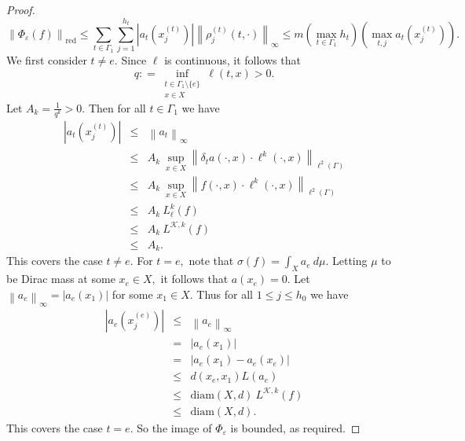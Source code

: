 \documentclass[a4paper,11pt,reqno]{amsart}
\theoremstyle{plain}
\theoremstyle{mainthmstyle}
\theoremstyle{named}
\numberwithin{equation}{section}
\newcommand{\Bea}{\begin{eqnarray*}}
\newcommand{\Eea}{\end{eqnarray*}}
\begin{document}
\begin{proof}
$$\left \|\Phi_{\varepsilon} (f) \right \|_{\mathrm {red}} \leq \sum\limits_{t \in \Gamma_1} \sum\limits_{j = 1}^{h_t} \left \lvert a_t \left (x_j^{(t)} \right ) \right \rvert \left \|\rho_j^{(t)} (t, \cdot) \right \|_{\infty} \leq m \left (\max\limits_{t \in \Gamma_1} h_t \right ) \left (\max\limits_{t, j} a_t \left (x_{j}^{(t)} \right ) \right ).$$
We first consider $t \neq e.$ Since $\ell$ is continuous, it follows that $$q : = \inf\limits_{\substack {t \in \Gamma_1 \setminus \{e\} \\ x \in X}} \ell (t, x) > 0.$$ Let $A_k = \frac {1} {q^k} > 0.$ Then for all $t \in \Gamma_1$ we have
\Bea
\left \lvert a_t \left (x_j^{(t)} \right ) \right \rvert &  \leq & \left \|a_t \right \|_{\infty} \\ & \leq & A_k\ \sup_{x \in X} \left \|\delta_t a (\cdot, x) \cdot \ell^{k} (\cdot, x) \right \|_{\ell^{2} (\Gamma)} \\ & \leq & A_k\ \sup_{x \in X} \left \|f (\cdot, x) \cdot \ell^{k} (\cdot, x) \right \|_{\ell^{2} (\Gamma)} \\ & \leq & A_k\ L_{\ell}^{k} (f) \\ & \leq & A_k\ L^{\mathcal K, k} (f) \\ & \leq & A_k.
\Eea
This covers the case $t \neq e.$ For $t = e,$ note that $\sigma (f) = \int_{X} a_e\ d \mu.$ Letting $\mu$ to be Dirac mass at some $x_e \in X,$ it follows that $a \left (x_e \right ) = 0.$ Let $\left \|a_e  \right \|_{\infty} = \left \lvert a_e \left (x_1 \right ) \right \rvert$ for some $x_1 \in X.$ Thus for all $1 \leq j \leq h_0$ we have \Bea \left \lvert a_e \left (x_j^{(e)} \right ) \right \rvert & \leq & \left \|a_e \right \|_{\infty} \\ & = & \left \lvert a_e \left (x_1 \right ) \right \rvert \\ & = & \left \lvert a_e \left (x_1 \right ) - a_e \left (x_e \right ) \right \rvert \\ & \leq & d \left (x_e, x_1 \right ) L \left (a_e \right ) \\ & \leq & \mathrm {diam} (X, d)\ L^{\mathcal K, k} (f) \\ & \leq & \mathrm {diam} (X, d).  \Eea
This covers the case $t = e.$ So the image of $\Phi_{\varepsilon}$ is bounded, as required.

\vspace{2mm}


\end{proof}
\end{document}
